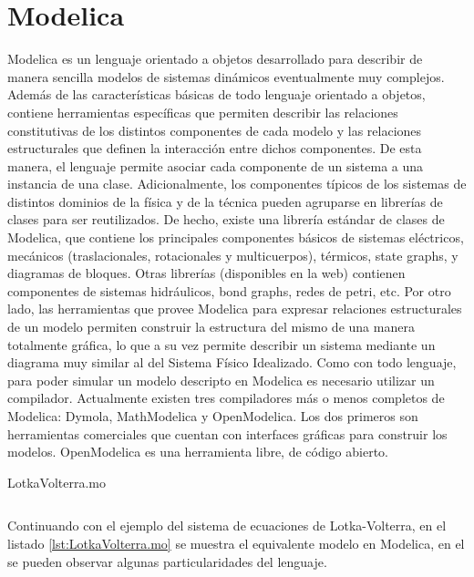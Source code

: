\section{Modelica}

	Modelica\cite{Fri98}\cite{Fritzson02modelica} es un lenguaje orientado a objetos desarrollado para describir de manera sencilla modelos de sistemas 
	dinámicos eventualmente muy complejos.
	Además de las características básicas de todo lenguaje orientado a objetos, contiene herramientas específicas que permiten describir las relaciones
	constitutivas de los distintos componentes de cada modelo y las relaciones estructurales que definen la interacción entre dichos componentes.
	De esta manera, el lenguaje permite asociar cada componente de un sistema a una instancia de una clase.
	Adicionalmente, los componentes típicos de los sistemas de distintos dominios de la física y de la técnica pueden agruparse en librerías de clases para ser
	reutilizados. De hecho, existe una librería estándar de clases de Modelica, que contiene los principales componentes básicos de sistemas eléctricos,
	mecánicos (traslacionales, rotacionales y multicuerpos), térmicos, state graphs, y diagramas de bloques. 
	Otras librerías (disponibles en la web) contienen componentes de sistemas hidráulicos, bond graphs, redes de petri, etc.
	Por otro lado, las herramientas que provee Modelica para expresar relaciones estructurales de un modelo permiten construir la estructura del mismo de una
	manera totalmente gráfica, lo que a su vez permite describir un sistema mediante un diagrama muy similar al del Sistema Físico Idealizado.
	Como con todo lenguaje, para poder simular un modelo descripto en Modelica es necesario utilizar un compilador. Actualmente existen tres compiladores
	más o menos completos de Modelica: Dymola, MathModelica y OpenModelica. Los dos primeros son herramientas comerciales que cuentan con interfaces
	gráficas para construir los modelos. OpenModelica es una herramienta libre, de código abierto.

\begin{listing}[H]    
	\caption{LotkaVolterra.mo}
	\inputminted[linenos]{modelica}{src/LotkaVolterra.mo}
	\label{lst:LotkaVolterra.mo}
\end{listing}
	
	Continuando con el ejemplo del sistema de ecuaciones de Lotka-Volterra, en el listado \ref{lst:LotkaVolterra.mo} se muestra el equivalente modelo en Modelica, 
	en el se pueden observar algunas particularidades del lenguaje.
	
